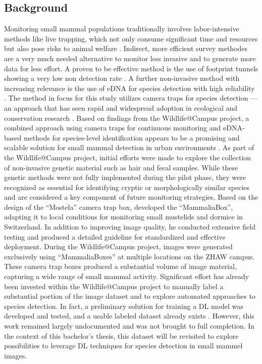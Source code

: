 \subsection{Background}
Monitoring small mammal populations traditionally involves labor-intensive methods like live trapping, which not only consume significant time and resources but also pose risks to animal welfare \autocite{grafWildlifeCampusKleineSaeugetiere2022}.
Indirect, more efficient survey methodes are a very much needed alternative to monitor less invasive and to generate more data for less effort.
A proven to be effective method is the use of footprint tunnels showing a very low non detection rate \autocite{yarnellUsingOccupancyAnalysis2014}.
A further non-invasive method with increasing relevance is the use of \ac{eDNA} for species detection with high reliability \autocite{thomsenEnvironmentalDNAEmerging2015}.
The method in focus for this study utilizes camera traps for species detection --- an approach that has seen rapid and widespread adoption in ecological and conservation research \autocite{delisleNextGenerationCameraTrapping2021}.
Based on findings from the Wildlife@Campus project, a combined approach using camera traps for continuous monitoring and \acs{eDNA}-based methods for species-level identification appears to be a promising and scalable solution for small mammal detection in urban environments \autocite{grafWildlifeCampusKleineSaeugetiere2022}.
As part of the Wildlife@Campus project, initial efforts were made to explore the collection of non-invasive genetic material such as hair and fecal samples.
While these genetic methods were not fully implemented during the pilot phase, they were recognized as essential for identifying cryptic or morphologically similar species and are considered a key component of future monitoring strategies.
Based on the design of the \enquote{Mostela} camera trap box, \textcite{aegerterMonitoringKleinmustelidenSchlaefern2019} developed the \enquote{MammaliaBox}, adapting it to local conditions for monitoring small mustelids and dormice in Switzerland.
In addition to improving image quality, he conducted extensive field testing and produced a detailed guideline for standardized and effective deployment.
During the Wildlife@Campus project, images were generated exclusively using \enquote{MammaliaBoxes} at multiple locations on the ZHAW campus. 
These camera trap boxes produced a substantial volume of image material, capturing a wide range of small mammal activity.
Significant effort has already been invested within the Wildlife@Campus project to manually label a substantial portion of the image dataset and to explore automated approaches to species detection.
In fact, a preliminary solution for training a \ac{DL} model was developed and tested, and a usable labeled dataset already exists \autocite{ratnaweeraWildlifeCampusProgressReports2021}.
However, this work remained largely undocumented and was not brought to full completion. 
In the context of this bachelor's thesis, this dataset will be revisited to explore possibilities to leverage \ac{DL} techniques for species detection in small mammel images.

